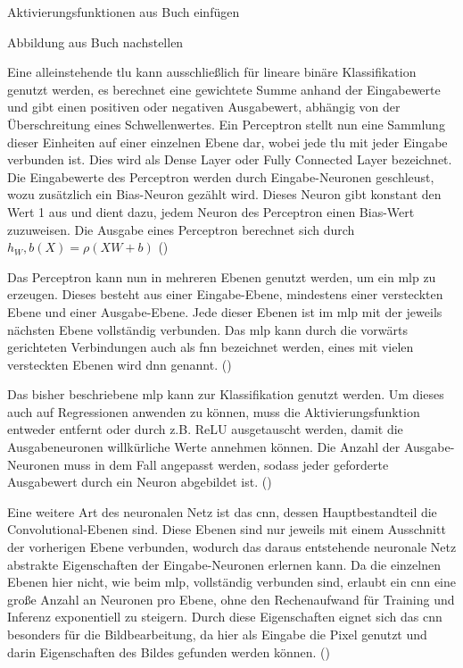 Aktivierungsfunktionen aus Buch einfügen

Abbildung aus Buch nachstellen

Eine alleinstehende \ac{tlu} kann ausschließlich für lineare binäre Klassifikation genutzt werden, es berechnet eine gewichtete Summe anhand der Eingabewerte und gibt einen positiven oder negativen Ausgabewert, abhängig von der Überschreitung eines Schwellenwertes. Ein Perceptron stellt nun eine Sammlung dieser Einheiten auf einer einzelnen Ebene dar, wobei jede \ac{tlu} mit jeder Eingabe verbunden ist. Dies wird als Dense Layer oder Fully Connected Layer bezeichnet. Die Eingabewerte des Perceptron werden durch Eingabe-Neuronen geschleust, wozu zusätzlich ein Bias-Neuron gezählt wird. Dieses Neuron gibt konstant den Wert 1 aus und dient dazu, jedem Neuron des Perceptron einen Bias-Wert zuzuweisen. Die Ausgabe eines Perceptron berechnet sich durch \(h_W,b(X)=\rho(XW+b)\) (\cite[vgl. S. 284 ff.]{Geron2019})

Das Perceptron kann nun in mehreren Ebenen genutzt werden, um ein \ac{mlp} zu erzeugen. Dieses besteht aus einer Eingabe-Ebene, mindestens einer versteckten Ebene und einer Ausgabe-Ebene. Jede dieser Ebenen ist im \ac{mlp} mit der jeweils nächsten Ebene vollständig verbunden. Das \ac{mlp} kann durch die vorwärts gerichteten Verbindungen auch als \ac{fnn} bezeichnet werden, eines mit vielen versteckten Ebenen wird \ac{dnn} genannt. (\cite[vgl. S. 284 ff.]{Geron2019})

Das bisher beschriebene \ac{mlp} kann zur Klassifikation genutzt werden. Um dieses auch auf Regressionen anwenden zu können, muss die Aktivierungsfunktion entweder entfernt oder durch z.B. ReLU ausgetauscht werden, damit die Ausgabeneuronen willkürliche Werte annehmen können. Die Anzahl der Ausgabe-Neuronen muss in dem Fall angepasst werden, sodass jeder geforderte Ausgabewert durch ein Neuron abgebildet ist. (\cite[vgl. S. 292 ff.]{Geron2019})

Eine weitere Art des neuronalen Netz ist das \ac{cnn}, dessen Hauptbestandteil die Convolutional-Ebenen sind. Diese Ebenen sind nur jeweils mit einem Ausschnitt der vorherigen Ebene verbunden, wodurch das daraus entstehende neuronale Netz abstrakte Eigenschaften der Eingabe-Neuronen erlernen kann. Da die einzelnen Ebenen hier nicht, wie beim \ac{mlp}, vollständig verbunden sind, erlaubt ein \ac{cnn} eine große Anzahl an Neuronen pro Ebene, ohne den Rechenaufwand für Training und Inferenz exponentiell zu steigern. Durch diese Eigenschaften eignet sich das \ac{cnn} besonders für die Bildbearbeitung, da hier als Eingabe die Pixel genutzt und darin Eigenschaften des Bildes gefunden werden können. (\cite[vgl. S. 447 f.]{Geron2019})

